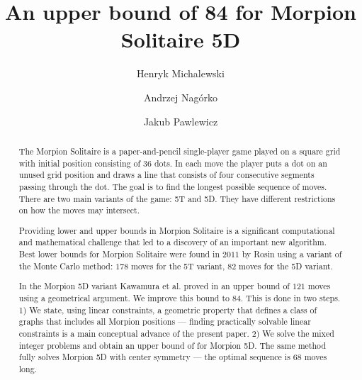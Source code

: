\documentclass[a4paper,UKenglish]{lipics}
\title{{An upper bound of 84 for Morpion Solitaire 5D}}%
\author[1]{Henryk Michalewski}
\author[1]{Andrzej Nagórko}
\author[1]{Jakub Pawlewicz}
\affil[1]{Department of Mathematics, Informatics and Mechanics\\ University of Warsaw\\ \{H.Michalewski,A.Nagorko,J.Pawlewicz\}@mimuw.edu.pl} %
\begin{document}
\maketitle

\begin{abstract} 
The Morpion Solitaire is a paper-and-pencil single-player game played on a square grid with initial position consisting of $36$ dots.
In each move the player puts a dot on an unused grid position and draws a line that 
  consists of four consecutive segments passing through the dot.
 The goal is to find the longest possible sequence of moves.
There are two main variants of the game: 5T and 5D. 
They have different restrictions on how the moves may intersect.

Providing lower and upper bounds in Morpion Solitaire is a significant computational and mathematical challenge
  that led to a discovery of an important new algorithm.
 Best lower bounds for Morpion Solitaire were found in $2011$ by Rosin \cite{rosin} using a variant of the Monte Carlo method: 
 $178$ moves for the 5T variant, $82$ moves for the 5D variant.
 

In the Morpion 5D variant 
Kawamura et al. proved in \cite{japonczycy} an upper bound of $121$ moves using a geometrical argument. 
We improve this bound to $84$. 
This is done in two steps.
1) We state, using linear constraints, a geometric property that defines a class of graphs that includes all Morpion  positions --- finding practically solvable linear constraints is a main conceptual advance of the present paper.
2) We solve the mixed integer problems and obtain 
an upper bound of \therecord for Morpion 5D. The same method fully solves Morpion 5D with center symmetry --- the optimal sequence is $68$ moves long. %
\end{abstract}


  



  






\printbibliography 

%
%
    
\end{document}
